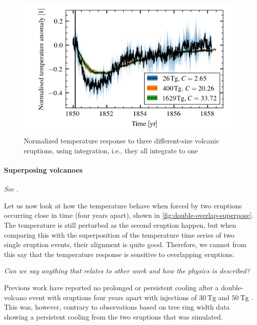 \documentclass[twocol]{ametsocV5}
\begin{document}
\begin{figure}
  \begin{center}
    \includegraphics[width=0.95\linewidth]{figures/compare-waveform-integrate.png}
  \end{center}
  \caption{Normalized temperature response to three different-size volcanic eruptions,
    using integration, i.e., they all integrate to one}%
  \label{fig:temp_norm_int}
\end{figure}

\paragraph{Superposing volcanoes}

\emph{See \citet{toohey2016b}.}

Let us now look at how the temperature behave when forced by two eruptions occurring
close in time (four years apart), shown in \cref{fig:double-overlap-superpose}. The
temperature is still perturbed as the second eruption happen, but when comparing this
with the superposition of the temperature time series of two single eruption events,
their alignment is quite good. Therefore, we cannot from this say that the temperature
response is sensitive to overlapping eruptions.

\emph{Can we say anything that relates to other work and how the physics is described?}

Previous work have reported no prolonged or persistent cooling after a double-volcano
event with eruptions four years apart with  injections of \( \SI{30}{\tera\gram}
\) and \( \SI{50}{\tera\gram} \) \citep{toohey2016b}. This was, however, contrary to
observations based on tree ring width data showing a persistent cooling from the two
eruptions that was simulated.
\end{document}
